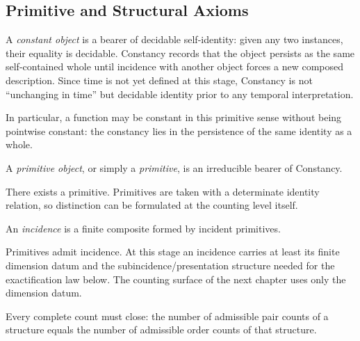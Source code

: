 \subsection{Primitive and Structural Axioms}
\label{subsec:three-axioms}

\begin{primitive}[Constancy]
A \emph{constant object} is a bearer of decidable self-identity: given any two
instances, their equality is decidable. Constancy records that the object
persists as the same self-contained whole until incidence with another object
forces a new composed description. Since time is not yet defined at this
stage, Constancy is not ``unchanging in time'' but decidable identity prior to
any temporal interpretation.
\end{primitive}

In particular, a function may be constant in this primitive sense without being
pointwise constant: the constancy lies in the persistence of the same identity
as a whole.

\begin{definition}[Primitive]\label{def:primitive}
A \emph{primitive object}, or simply a \emph{primitive}, is an irreducible bearer of Constancy.
\end{definition}

\begin{axiom}[Existence]\label{ax:extent}
There exists a primitive.
Primitives are taken with a determinate identity relation, so distinction can
be formulated at the counting level itself.
\end{axiom}

\begin{definition}[Incidence]\label{def:incidence}
An \emph{incidence} is a finite composite formed by incident primitives.
\end{definition}

\begin{axiom}[Incidence]\label{ax:meeting}
Primitives admit incidence.
At this stage an incidence carries at least its finite dimension datum and the
subincidence/presentation structure needed for the exactification law below.
The counting surface of the next chapter uses only the dimension datum.
\end{axiom}

\begin{axiom}\label{ax:closure}
Every complete count must close: the number of admissible pair counts of a structure equals the number of admissible order counts of that structure.
\end{axiom}

